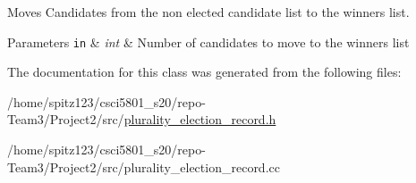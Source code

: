 Moves Candidates from the non elected candidate list to the winners list. 


\begin{DoxyParams}[1]{Parameters}
\mbox{\tt in}  & {\em int} & Number of candidates to move to the winners list \\
\hline
\end{DoxyParams}


The documentation for this class was generated from the following files\+:\begin{DoxyCompactItemize}
\item 
/home/spitz123/csci5801\+\_\+s20/repo-\/\+Team3/\+Project2/src/\hyperlink{plurality__election__record_8h}{plurality\+\_\+election\+\_\+record.\+h}\item 
/home/spitz123/csci5801\+\_\+s20/repo-\/\+Team3/\+Project2/src/plurality\+\_\+election\+\_\+record.\+cc\end{DoxyCompactItemize}
